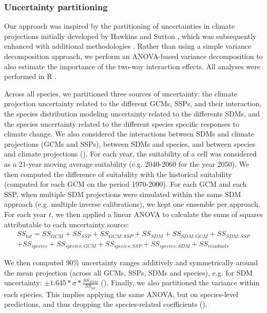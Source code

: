 \documentclass[letterpaper,8pt]{extarticle}  %
\begin{document}
\begin{doublespacing}
\begin{linenumbers}
\subsubsection{Uncertainty partitioning}

Our approach was inspired by the partitioning of uncertainties in climate projections initially developed by Hawkins and Sutton \citep{Hawkins2009, Hawkins2011}, which was subsequently enhanced with additional methodologies \citep[e.g.][]{Yip2011, Lafferty2023}. 
Rather than using a simple variance decomposition approach, we perform an ANOVA-based variance decomposition to also estimate the importance of the two-way interaction effects. All analyses were performed in R \citep{RCT2024}.

Across all species, we partitioned three sources of uncertainty: the climate projection uncertainty related to the different GCMs, SSPs, and their interaction, the species distribution modeling uncertainty related to the differents SDMs, and the species uncertainty related to the different species specific responses to climate change. We also considered the interactions between SDMs and climate projections (GCMs and SSPs), between SDMs and species, and between species and climate projections (). For each year, the suitability of a cell was considered as a 21-year moving average suitability (e.g. 2040-2060 for the year 2050). We then computed the difference of suitability with the historical suitability (computed for each GCM on the period 1970-2000). For each GCM and each SSP, when multiple SDM projections were simulated within the same SDM approach (e.g. multiple inverse calibrations), we kept one ensemble per approach. For each year $t$, we then applied a linear ANOVA to calculate the sums of squares attributable to each uncertainty source:
\begin{multline*}
{SS}_{tot} = {SS}_{GCM} + {SS}_{SSP} + {SS}_{GCM:SSP} + {SS}_{SDM} + {SS}_{SDM:GCM} + {SS}_{SDM:SSP}\\+ {SS}_{species} + {SS}_{species:GCM} + {SS}_{species:SSP} + {SS}_{species:SDM} + {SS}_{residuals}
\end{multline*}

We then computed 90\% uncertainty ranges additively and symmetrically around the mean projection (across all GCMs, SSPs, SDMs and species), e.g. for SDM uncertainty: $\pm1.645*\sigma*\frac{{SS}_{SDM}}{{SS}_{tot}}$ ().
Finally, we also partitioned the variance within each species. This implies applying the same ANOVA, but on species-level predictions, and thus dropping the species-related coefficients ().


\end{linenumbers}
\end{doublespacing}
\end{document}
